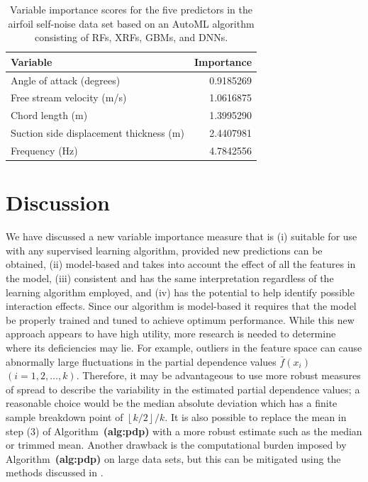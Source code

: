 \documentclass[12pt]{article}
\def\ref#1{\textbf{(#1)}}
\begin{document}
\begin{table}[!htb]
  \centering
  \begin{tabular}{lr}
    \toprule
    Variable                                & Importance\\
    \midrule
    Angle of attack (degrees)               & 0.9185269\\
    Free stream velocity (m/s)              & 1.0616875\\
    Chord length (m)                        & 1.3995290\\
    Suction side displacement thickness (m) & 2.4407981\\
    Frequency (Hz)                          & 4.7842556\\
    \bottomrule
  \end{tabular}
  \caption{Variable importance scores for the five predictors in the airfoil self-noise data set based on an AutoML algorithm consisting of RFs, XRFs, GBMs, and DNNs. \label{tab:aml-vi}}
\end{table}


\section{Discussion}
\label{sec:conc}

We have discussed a new variable importance measure that is (i) suitable for use with any supervised learning algorithm, provided new predictions can be obtained, (ii) model-based and takes into account the effect of all the features in the model, (iii) consistent and has the same interpretation regardless of the learning algorithm employed, and (iv) has the potential to help identify possible interaction effects. Since our algorithm is model-based it requires that the model be properly trained and tuned to achieve optimum performance. While this new approach appears to have high utility, more research is needed to determine where its deficiencies may lie. For example, outliers in the feature space can cause abnormally large fluctuations in the partial dependence values $\bar{f}\left(x_{i}\right)$ $\left(i = 1, 2, \dots, k\right)$. Therefore, it may be advantageous to use more robust measures of spread to describe the variability in the estimated partial dependence values; a reasonable choice would be the median absolute deviation which has a finite sample breakdown point of $\left\lfloor{k / 2}\right\rfloor / k$. It is also possible to replace the mean in step (3) of Algorithm~\ref{alg:pdp} with a more robust estimate such as the median or trimmed mean. Another drawback is the computational burden imposed by Algorithm~\ref{alg:pdp} on large data sets, but this can be mitigated using the methods discussed in \citet{pdp-greenwell-2017}.
\end{document}
